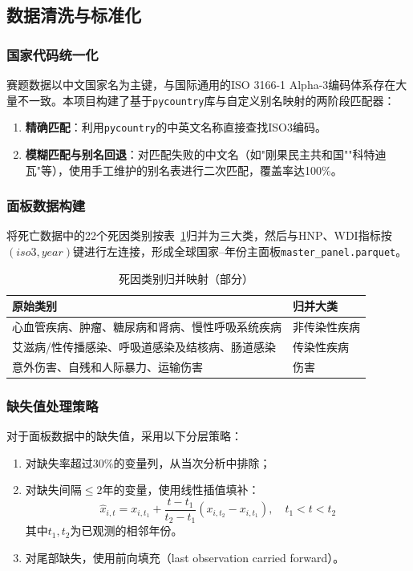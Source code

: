 \documentclass[12pt,a4paper]{ctexart}
\begin{document}
\subsection{数据清洗与标准化}

\subsubsection{国家代码统一化}

赛题数据以中文国家名为主键，与国际通用的ISO 3166-1 Alpha-3编码体系存在大量不一致。本项目构建了基于\texttt{pycountry}库与自定义别名映射的两阶段匹配器：

\begin{enumerate}[label=\arabic*)]
    \item \textbf{精确匹配}：利用\texttt{pycountry}的中英文名称直接查找ISO3编码。
    \item \textbf{模糊匹配与别名回退}：对匹配失败的中文名（如"刚果民主共和国""科特迪瓦"等），使用手工维护的别名表进行二次匹配，覆盖率达100\%。
\end{enumerate}

\subsubsection{面板数据构建}

将死亡数据中的22个死因类别按表~\ref{tab:cause-group}归并为三大类，然后与HNP、WDI指标按$(iso3, year)$键进行左连接，形成全球国家--年份主面板\texttt{master\_panel.parquet}。

\begin{table}[H]
\centering
\caption{死因类别归并映射（部分）}
\label{tab:cause-group}
\begin{tabular}{ll}
\toprule
\textbf{原始类别} & \textbf{归并大类} \\
\midrule
心血管疾病、肿瘤、糖尿病和肾病、慢性呼吸系统疾病 & 非传染性疾病 \\
艾滋病/性传播感染、呼吸道感染及结核病、肠道感染 & 传染性疾病 \\
意外伤害、自残和人际暴力、运输伤害 & 伤害 \\
\bottomrule
\end{tabular}
\end{table}

\subsubsection{缺失值处理策略}

对于面板数据中的缺失值，采用以下分层策略：
\begin{enumerate}[label=\arabic*)]
    \item 对缺失率超过30\%的变量列，从当次分析中排除；
    \item 对缺失间隔$\leq 2$年的变量，使用线性插值填补：
    \begin{equation}
        \hat{x}_{i,t} = x_{i,t_1} + \frac{t - t_1}{t_2 - t_1}(x_{i,t_2} - x_{i,t_1}), \quad t_1 < t < t_2
    \end{equation}
    其中$t_1, t_2$为已观测的相邻年份。
    \item 对尾部缺失，使用前向填充（last observation carried forward）。
\end{enumerate}
\end{document}
